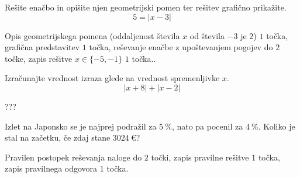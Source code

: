 \documentclass[addpoints]{exam}
\begin{document}
\begin{questions}
    \question[5]
    Rešite enačbo in opišite njen geometrijski pomen ter rešitev grafično prikažite.
    $$  5=\left\lvert x-3\right\rvert $$
    
    
    \begin{solution}[8cm]
        Opis geometrijskega pomena (oddaljenost števila $x$ od števila $-3$ je $2$) $1$ točka, grafična predstavitev $1$ točka, reševanje enačbe z upoštevanjem pogojev do $2$ točke, zapis rešitve $x\in\{-5,-1\}$ $1$ točka..
    \end{solution}


    \newpage





    \question[5]
    Izračunajte vrednost izraza glede na vrednost spremenljivke $x$.
    $$\left\lvert x+8 \right\rvert + \left\lvert x-2 \right\rvert $$
    
    
    \begin{solution}[10cm]
        ???
    \end{solution}



    
    





    \question[4]
    Izlet na Japonsko se je najprej podražil za $5~\%$, nato pa pocenil za $4~\%$. 
    Koliko je stal na začetku, če zdaj stane $3024~€$?
    
    
    \begin{solution}[3cm]
        Pravilen postopek reševanja naloge do $2$ točki, zapis pravilne rešitve $1$ točka, zapis pravilnega odgovora $1$ točka.
    \end{solution}

     \newpage




\end{questions}
\end{document}
